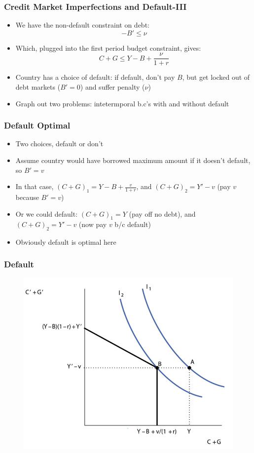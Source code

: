 \documentclass{beamer}
\begin{document}
\begin{frame}
\frametitle[alignment=center]{Credit Market Imperfections and Default-III}
\begin{itemize}
\item We have the non-default constraint on debt:
$$-B'\leq \nu$$
\item Which, plugged into the first period budget constraint, gives:
$$C+G\leq Y-B+\frac{\nu}{1+r}$$
\item Country has a choice of default:  if default, don't pay $B$, but get locked out of debt markets ($B'=0$) and suffer penalty ($\nu$)
\bigskip
\item Graph out two problems: intetermporal b.c's with and without default
\end{itemize}
\end{frame}

\begin{frame}
\frametitle[alignment=center]{Default Optimal}
\begin{itemize}
\item Two choices, default or don't
\bigskip
\item Assume country would have borrowed maximum amount if it doesn't default, so $B'=v$
\bigskip
\item In that case, $(C+G)_1=Y-B+\frac{v}{1+r}$, and $(C+G)_2=Y'-v$ (pay $v$ because $B'=v$)
\bigskip
\item Or we could default:  $(C+G)_1=Y$ (pay off no debt), and $(C+G)_2=Y'-v$ (now pay $v$ b/c default)
\bigskip
\item Obviously default is optimal here
\end{itemize}
\end{frame}



\begin{frame}
\frametitle[alignment=center]{Default}
\begin{figure}
\centering
\includegraphics[scale=0.7]{Figures/W_Fig_16pt3.png}
\end{figure}
\end{frame}
\end{document}
